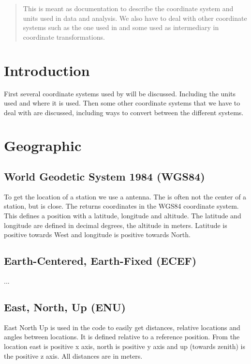 \begin{abstract}

This is meant as documentation to describe the coordinate system and
units used in \hisparc data and analysis. We also have to deal with
other coordinate systems such as the one used in \corsika and some used
as intermediary in coordinate transformations.

\end{abstract}


\section{Introduction}

First several coordinate systems used by \hisparc will be discussed.
Including the units used and where it is used. Then some other
coordinate systems that we have to deal with are discussed, including
ways to convert between the different systems.


\section{Geographic}

\subsection{World Geodetic System 1984 (WGS84)}

To get the location of a station we use a \gps antenna. The \gps is
often not the center of a station, but is close. The \gps returns
coordinates in the WGS84 coordinate system. This defines a position with
a latitude, longitude and altitude. The latitude and longitude are
defined in decimal degrees, the altitude in meters. Latitude is positive towards West and longitude is positive towards North.


\subsection{Earth-Centered, Earth-Fixed (ECEF)}

...


\subsection{East, North, Up (ENU)}

East North Up is used in the code to easily get distances, relative
locations and angles between locations. It is defined relative to a
reference position. From the location east is positive x axis, north is
positive y axis and up (towards zenith) is the positive z axis. All
distances are in meters.


